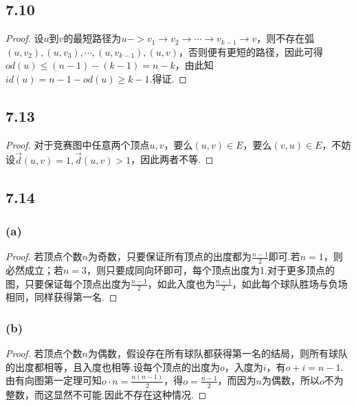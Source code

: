 \documentclass[twocolumn]{article}
\newenvironment{SChinese}{%
	\CJKfamily{gbsn}%
	\CJKtilde
	\CJKnospace}{}
\begin{document}
\begin{CJK}{UTF8}{}
\begin{SChinese}
				\subsection*{7.10}
					\begin{proof}
						设$u$到$v$的最短路径为$u->v_1\rightarrow v_2\rightarrow\cdots\rightarrow v_{k-1}\rightarrow v$，则不存在弧$(u,v_2),(u,v_3),\cdots,(u,v_{k-1}),(u,v)$，否则便有更短的路径，因此可得$od(u)\le (n-1)-(k-1)=n-k$，由此知$id(u)=n-1-od(u)\ge k-1$.得证.
					\end{proof}
				\subsection*{7.13}
					\begin{proof}
						对于竞赛图中任意两个顶点$u,v$，要么$(u,v)\in E$，要么$(v,u)\in E$，不妨设$\overrightarrow{d}(u,v)=1,\overrightarrow{d}(u,v)>1$，因此两者不等.
					\end{proof}
				\subsection*{7.14}
					\subsubsection*{(a)}
						\begin{proof}
							若顶点个数$n$为奇数，只要保证所有顶点的出度都为$\frac{n-1}{2}$即可.若$n=1$，则必然成立；若$n=3$，则只要成同向环即可，每个顶点出度为1.对于更多顶点的图，只要保证每个顶点出度为$\frac{n-1}{2}$，如此入度也为$\frac{n-1}{2}$，如此每个球队胜场与负场相同，同样获得第一名.
						\end{proof}
					\subsubsection*{(b)}
						\begin{proof}
							若顶点个数$n$为偶数，假设存在所有球队都获得第一名的结局，则所有球队的出度都相等，且入度也相等.设每个顶点的出度为$o$，入度为$i$，有$o+i=n-1$.由有向图第一定理可知$o\cdot n=\frac{n(n-1)}{2}$，得$o=\frac{n-1}{2}$，而因为$n$为偶数，所以$o$不为整数，而这显然不可能.因此不存在这种情况.
						\end{proof}

\end{SChinese}
\end{CJK}
\end{document}
